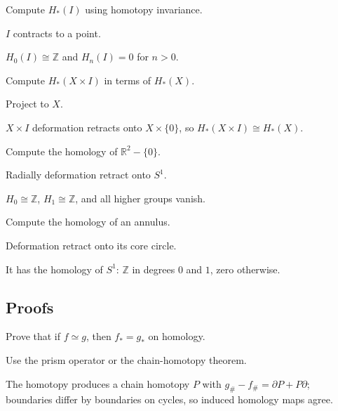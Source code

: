 \begin{exercise}\label{exr:viii20-ped-02}
Compute $H_*(I)$ using homotopy invariance.
\end{exercise}
\begin{hint}
$I$ contracts to a point.
\end{hint}
\begin{solution}
$H_0(I)\cong\mathbb Z$ and $H_n(I)=0$ for $n>0$.
\end{solution}

\begin{exercise}\label{exr:viii20-ped-03}
Compute $H_*(X\times I)$ in terms of $H_*(X)$.
\end{exercise}
\begin{hint}
Project to $X$.
\end{hint}
\begin{solution}
$X\times I$ deformation retracts onto $X\times\{0\}$, so $H_*(X\times I)\cong H_*(X)$.
\end{solution}

\begin{exercise}\label{exr:viii20-ped-04}
Compute the homology of $\mathbb R^2-\{0\}$.
\end{exercise}
\begin{hint}
Radially deformation retract onto $S^1$.
\end{hint}
\begin{solution}
$H_0\cong\mathbb Z$, $H_1\cong\mathbb Z$, and all higher groups vanish.
\end{solution}

\begin{exercise}[Annulus]\label{exr:viii20-ped-05}
Compute the homology of an annulus.
\end{exercise}
\begin{hint}
Deformation retract onto its core circle.
\end{hint}
\begin{solution}
It has the homology of $S^1$: $\mathbb Z$ in degrees $0$ and $1$, zero otherwise.
\end{solution}

\subsection*{Proofs}

\begin{exercise}\label{exr:viii20-ped-06}
Prove that if $f\simeq g$, then $f_*=g_*$ on homology.
\end{exercise}
\begin{hint}
Use the prism operator or the chain-homotopy theorem.
\end{hint}
\begin{solution}
The homotopy produces a chain homotopy $P$ with $g_\#-f_\#=\partial P+P\partial$; boundaries differ by boundaries on cycles, so induced homology maps agree.
\end{solution}

